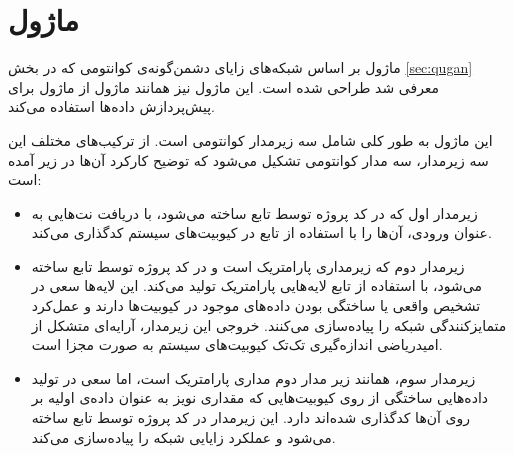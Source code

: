 \section{
ماژول
}
ماژول
بر اساس شبکه‌های زایای دشمن‌گونه‌ی کوانتومی که در بخش
\ref{sec:qugan}
معرفی شد طراحی شده است.
این ماژول نیز همانند ماژول
از ماژول
برای پیش‌پردازش داده‌ها استفاده می‌کند.

این ماژول به طور کلی شامل سه زیرمدار کوانتومی است. از ترکیب‌های مختلف این سه زیرمدار، سه مدار کوانتومی تشکیل می‌شود که توضیح کارکرد آن‌ها در زیر آمده است:

\begin{itemize}
    \item زیرمدار اول که در کد پروژه توسط تابع
    ساخته می‌شود، با دریافت نت‌هایی به عنوان ورودی، آن‌ها را با استفاده از تابع
    در کیوبیت‌های سیستم کدگذاری می‌کند.
    
    \item زیرمدار دوم که زیرمداری پارامتریک است و در کد پروژه توسط تابع
    ساخته می‌شود، با استفاده از تابع
    لایه‌هایی پارامتریک تولید می‌کند. این لایه‌ها سعی در تشخیص واقعی یا ساختگی بودن داده‌های موجود در کیوبیت‌ها دارند و عمل‌کرد متمایزکنندگی شبکه را پیاده‌سازی می‌کنند.
    خروجی این زیرمدار، آرایه‌ای متشکل از امیدریاضی اندازه‌گیری تک‌تک کیوبیت‌های سیستم به صورت مجزا است.
    
    \item زیرمدار سوم، همانند زیر مدار دوم مداری پارامتریک است، اما سعی در تولید داده‌هایی ساختگی از روی کیوبیت‌هایی که مقداری نویز به عنوان داده‌ی اولیه بر روی آن‌ها کدگذاری شده‌اند دارد. این زیرمدار در کد پروژه توسط تابع
    ساخته می‌شود و عملکرد زایایی شبکه را پیاده‌سازی می‌کند.
\end{itemize}

